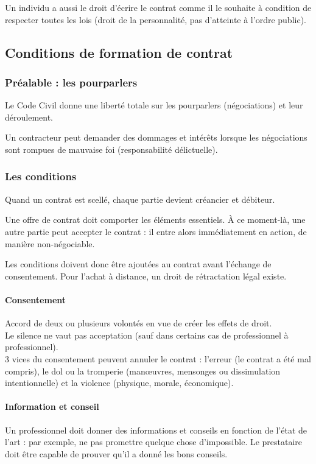 \documentclass[10pt,a4paper,french]{article}
\begin{document}
Un individu a aussi le droit d'écrire le contrat comme il le souhaite à condition de respecter toutes les lois (droit de la personnalité, pas d'atteinte à l'ordre public).

\subsection{Conditions de formation de contrat}

\subsubsection{Préalable : les pourparlers}
Le Code Civil donne une liberté totale sur les pourparlers (négociations) et leur déroulement.

Un contracteur peut demander des dommages et intérêts lorsque les négociations sont rompues de mauvaise foi (responsabilité délictuelle).

\subsubsection{Les conditions}

Quand un contrat est scellé, chaque partie devient créancier et débiteur.

Une offre de contrat doit comporter les éléments essentiels. À ce moment-là, une autre partie peut accepter le contrat : il entre alors immédiatement en action, de manière non-négociable.

Les conditions doivent donc être ajoutées au contrat avant l'échange de consentement. Pour l'achat à distance, un droit de rétractation légal existe.

\paragraph{Consentement}
Accord de deux ou plusieurs volontés en vue de créer les effets de droit. \\
Le silence ne vaut pas acceptation (sauf dans certains cas de professionnel à professionnel). \\
3 vices du consentement peuvent annuler le contrat : l'erreur (le contrat a été mal compris), le dol ou la tromperie (manœuvres, mensonges ou dissimulation intentionnelle) et la violence (physique, morale, économique).

\paragraph{Information et conseil}
Un professionnel doit donner des informations et conseils en fonction de l'état de l'art : par exemple, ne pas promettre quelque chose d'impossible. Le prestataire doit être capable de prouver qu'il a donné les bons conseils.
\end{document}
